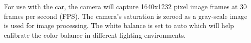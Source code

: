 \documentclass{article}
\begin{document}
For use with the car, the camera will capture 1640x1232 pixel image frames at 30 frames per second (FPS). The camera's saturation is zeroed as a gray-scale image is used for image processing. The white balance is set to auto which will help calibrate the color balance in different lighting environments.

\end{document}
